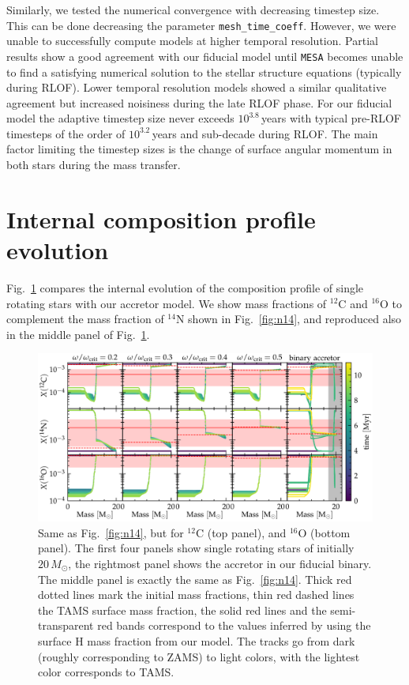 \documentclass[twocolumn,twocolappendix,trackchanges]{aastex63}
\DeclareRobustCommand{\Figref}[1]{Fig.~\ref{#1}}
\begin{document}
Similarly, we tested the numerical convergence with decreasing
timestep size. This can be done decreasing the parameter
\texttt{mesh\_time\_coeff}. However, we were unable to successfully
compute models at higher temporal resolution. Partial results show a
good agreement with our fiducial model until \texttt{MESA} becomes
unable to find a satisfying numerical solution to the stellar
structure equations (typically
during RLOF). Lower temporal resolution models showed a similar
qualitative agreement but increased noisiness during the late RLOF
phase. For our fiducial model the adaptive timestep size never exceeds
$10^{3.8}$\,years with typical pre-RLOF timesteps of the order of $10^{3.2}$\,years
and sub-decade during RLOF. The main factor limiting the timestep
sizes is the change of surface angular momentum in both stars during
the mass transfer.


\section{Internal composition profile evolution}
\label{sec:X_fig}


\Figref{fig:composition_huge} compares the internal evolution of the composition
profile of single rotating stars with our accretor model.
We show mass fractions of $^{12}\mathrm{C}$  and $^{16}\mathrm{O}$ to complement the
mass fraction of $^{14}\mathrm{N}$ shown in \Figref{fig:n14}, and
reproduced also in the middle panel of \Figref{fig:composition_huge}.


\begin{figure}[hp]
  \centering
  \includegraphics[width=\textwidth]{huge_composition}
  \caption{Same as \Figref{fig:n14}, but for $^{12}\mathrm{C}$ (top
    panel), and $^{16}\mathrm{O}$ (bottom panel). The first four
    panels show single rotating stars of initially $20\,M_\odot$, the
    rightmost panel shows the accretor in our fiducial binary. The middle panel is
    exactly the same as \Figref{fig:n14}. Thick red dotted lines mark the
    initial mass fractions, thin red dashed lines the TAMS surface mass
    fraction, the solid red lines and the semi-transparent red bands
    correspond to the values inferred by 
    using the surface H mass fraction from our model. The tracks go
    from dark (roughly corresponding to ZAMS) to light colors, with the
    lightest color corresponds to TAMS.}
  \label{fig:composition_huge}
\end{figure}



\end{document}
